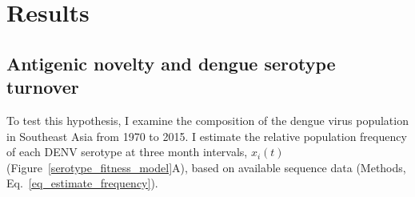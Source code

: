 \section{Results}

\subsection{Antigenic novelty and dengue serotype turnover}
To test this hypothesis, I examine the composition of the dengue virus population in Southeast Asia from 1970 to 2015.
I estimate the relative population frequency of each DENV serotype at three month intervals, $x_i(t)$ (Figure~\ref{serotype_fitness_model}A), based on available sequence data (Methods, Eq.~\ref{eq_estimate_frequency}).

